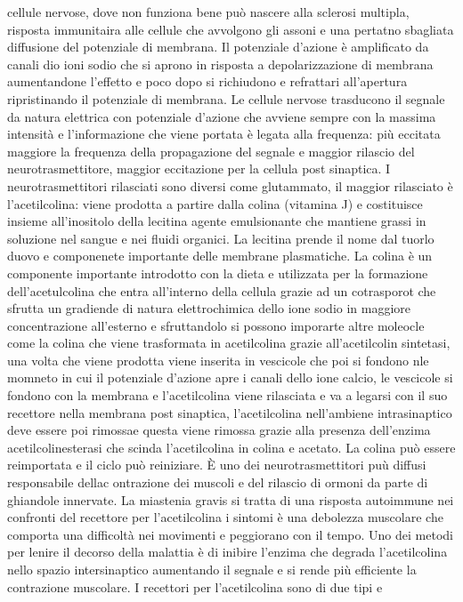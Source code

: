 cellule nervose, dove non funziona bene pu\`o nascere alla sclerosi multipla, risposta immunitaira alle cellule che avvolgono gli assoni e una pertatno sbagliata diffusione del potenziale
di membrana. Il potenziale d'azione \`e amplificato da canali dio ioni sodio che si aprono in risposta a depolarizzazione di membrana aumentandone l'effetto e poco dopo si richiudono 
e refrattari all'apertura ripristinando il potenziale di membrana. Le cellule nervose trasducono il segnale da natura elettrica con potenziale d'azione che avviene sempre con la massima
intensit\`a e l'informazione che viene portata \`e legata alla frequenza: pi\`u eccitata maggiore la frequenza della propagazione del segnale e maggior rilascio del neurotrasmettitore, 
maggior eccitazione per la cellula post sinaptica. I neurotrasmettitori rilasciati sono diversi come glutammato, il maggior rilasciato \`e l'acetilcolina: viene prodotta a partire dalla
colina (vitamina J) e costituisce insieme all'inositolo della lecitina agente emulsionante che mantiene grassi in soluzione nel sangue e nei fluidi organici. La lecitina prende il nome
dal tuorlo duovo e componenete importante delle membrane plasmatiche. La colina \`e un componente importante introdotto con la dieta e utilizzata per la formazione dell'acetulcolina che
entra all'interno della cellula grazie ad un cotrasporot che sfrutta un gradiende di natura elettrochimica dello ione sodio in maggiore concentrazione all'esterno e sfruttandolo si 
possono imporarte altre moleocle come la colina che viene trasformata in acetilcolina grazie all'acetilcolin sintetasi, una volta che viene prodotta viene inserita in vescicole che poi
si fondono nle momneto in cui il potenziale d'azione apre i canali dello ione calcio, le vescicole si fondono con la membrana e l'acetilcolina viene rilasciata e va a legarsi con il suo
recettore nella membrana post sinaptica, l'acetilcolina nell'ambiene intrasinaptico deve essere poi rimossae questa viene rimossa grazie alla presenza dell'enzima acetilcolinesterasi che 
scinda l'acetilcolina in colina e acetato. La colina pu\`o essere reimportata e il ciclo pu\`o reiniziare. \`E uno dei neurotrasmettitori pu\`u diffusi responsabile dellac ontrazione dei
muscoli e del rilascio di ormoni da parte di ghiandole innervate. La miastenia gravis si tratta di una risposta autoimmune nei confronti del recettore per l'acetilcolina i sintomi \`e
una debolezza muscolare che comporta una difficolt\`a nei movimenti e peggiorano con il tempo. Uno dei metodi per lenire il decorso della malattia \`e di inibire l'enzima che 
degrada l'acetilcolina nello spazio intersinaptico aumentando il segnale e si rende pi\`u efficiente la contrazione muscolare. I recettori per l'acetilcolina sono di due tipi e 
